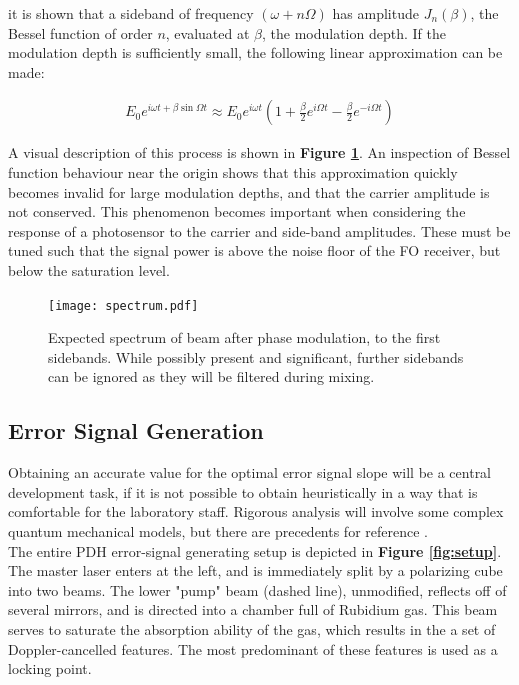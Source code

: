 it is shown that a sideband of frequency $(\omega +n\Omega)$ has amplitude
$J_n(\beta)$, the Bessel function of order $n$, evaluated at $\beta$, the
modulation depth. If the modulation depth is sufficiently small, the following
linear approximation can be made:

\begin{gather}
  E_0 e^{i \omega t + \beta \sin \Omega t}  \approx
    E_0 e^{i\omega t} \left(1 + \frac{\beta}{2}e^{i\Omega t} -
      \frac{\beta}{2} e^{-i\Omega t} \right)
\end{gather}

A visual description of this process is shown in
\textbf{Figure \ref{fig:eom_spectrum}}.
An inspection of Bessel function behaviour near the origin shows that
this approximation quickly becomes invalid for large modulation depths, and
that the carrier amplitude is not conserved. This phenomenon becomes important
when considering the response of a photosensor to the carrier and side-band
amplitudes. These must be tuned such that the signal power is above the noise
floor of the FO receiver, but below the saturation level.

\begin{figure}
  \centering
  \texttt{[image: spectrum.pdf]}
  \caption{Expected spectrum of beam after phase modulation, to the first
  sidebands. While possibly present and significant, further sidebands can
  be ignored as they will be filtered during mixing.}
  \label{fig:eom_spectrum}
\end{figure}

\subsection{Error Signal Generation}

Obtaining an accurate value for the optimal error signal slope will be a central
development task, if it is not possible to obtain heuristically in
a way that is comfortable for the laboratory staff. Rigorous analysis will
involve some complex quantum mechanical models, but there are precedents for
reference \cite{maguire2006}. \\

The entire PDH error-signal generating setup is depicted in
\textbf{ Figure \ref{fig:setup}}.
The master laser enters at the left, and is immediately split by a
polarizing cube into two beams.  The lower "pump" beam (dashed line), unmodified,
reflects off of several mirrors, and is directed into a chamber full of
Rubidium gas. This beam serves to saturate the absorption ability of the gas,
which results in the a set of Doppler-cancelled features.
The most predominant of these features is used as a locking point. \\


